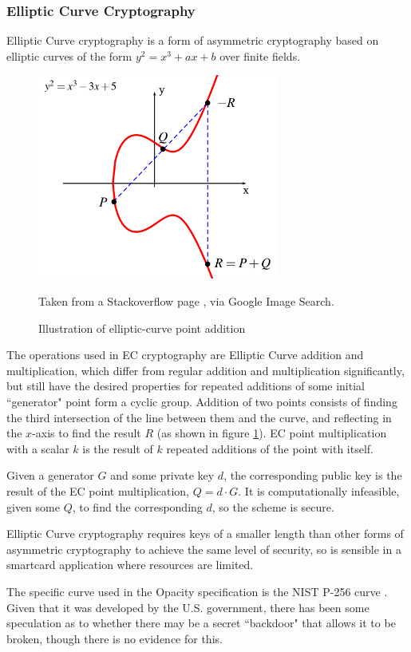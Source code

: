 \documentclass[12pt,a4paper]{article}
\begin{document}
\subsubsection{Elliptic Curve Cryptography}
Elliptic Curve cryptography is a form of asymmetric cryptography based on elliptic curves of the form $y^2=x^3+ax+b$ over finite fields. 
\begin{figure} [ht]
	\centering
	\includegraphics[scale=0.5]{implementation/elliptic_curve}
	\caption{Illustration of elliptic-curve point addition}
	Taken from a Stackoverflow page \cite{ec_diagram}, via Google Image Search.
	\label{figure:ec_add}
\end{figure}

The operations used in EC cryptography are Elliptic Curve addition and multiplication, which differ from regular addition and multiplication significantly, but still have the desired properties for repeated additions of some initial ``generator" point form a cyclic group. Addition of two points consists of finding the third intersection of the line between them and the curve, and reflecting in the $x$-axis to find the result $R$ (as shown in figure \ref{figure:ec_add}). EC point multiplication with a scalar $k$ is the result of $k$ repeated additions of the point with itself.

Given a generator $G$ and some private key $d$, the corresponding public key is the result of the EC point multiplication, $Q=d \cdot G$. It is computationally infeasible, given some $Q$, to find the corresponding $d$, so the scheme is secure.

Elliptic Curve cryptography requires keys of a smaller length than other forms of asymmetric cryptography to achieve the same level of security, so is sensible in a smartcard application where resources are limited.

The specific curve used in the Opacity specification is the NIST P-256 curve \cite{p256}. Given that it was developed by the U.S. government, there has been some speculation as to whether there may be a secret ``backdoor" that allows it to be broken, though there is no evidence for this.
\end{document}
